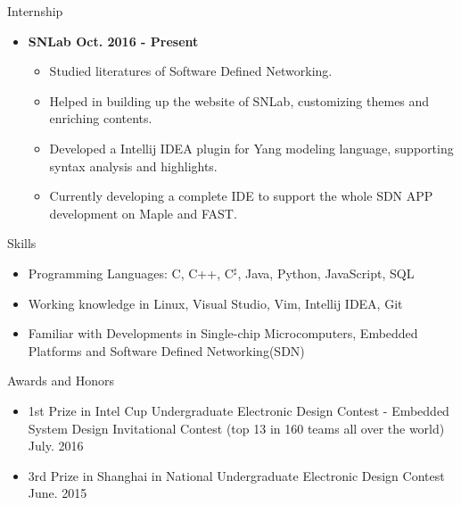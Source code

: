 \documentclass[10pt,oneside]{article}
\newenvironment{ressection}[1]{
	\vspace{4pt}
	{\fontfamily{phv}\selectfont\Large#1}
	\begin{itemize}
	\vspace{3pt}
}{
	\end{itemize}
}
\newcommand{\resitem}[1]{
	\vspace{-4pt}
	\item \begin{flushleft} #1 \end{flushleft}
}
\newcommand{\ressubitem}[1]{
	\vspace{-1pt}
	\item \begin{flushleft} #1 \end{flushleft}
}
\newenvironment{reslist}[1]{
	\resitem{\textbf{#1}}
	\vspace{-5pt}
	\begin{itemize}
}{
	\end{itemize}
}
\begin{document}
\begin{ressection}{Internship}
	\begin{reslist}{SNLab \hfill Oct. 2016 - Present}
		\ressubitem{Studied literatures of Software Defined Networking.}
		\ressubitem{Helped in building up the website of SNLab, customizing themes and enriching contents.}
		\ressubitem{Developed a Intellij IDEA plugin for Yang modeling language, supporting syntax analysis and highlights.}
		\ressubitem{Currently developing a complete IDE to support the whole SDN APP development on Maple and FAST.}
	\end{reslist}
\end{ressection}

\begin{ressection}{Skills}

	\resitem{Programming Languages: C, C++, C$^\sharp$, Java, Python, JavaScript, SQL}
	\resitem{Working knowledge in Linux, Visual Studio, Vim, Intellij IDEA, Git}
	\resitem{Familiar with Developments in Single-chip Microcomputers, Embedded Platforms and Software Defined Networking(SDN)}
	
\end{ressection}




\begin{ressection}{Awards and Honors}
	\resitem{1st Prize in Intel Cup Undergraduate Electronic Design Contest - Embedded System Design Invitational Contest (top 13 in 160 teams all over the world) \hfill July. 2016}
	\resitem{3rd Prize in Shanghai in National Undergraduate Electronic Design Contest \hfill {June. 2015}}
\end{ressection}
\end{document}
